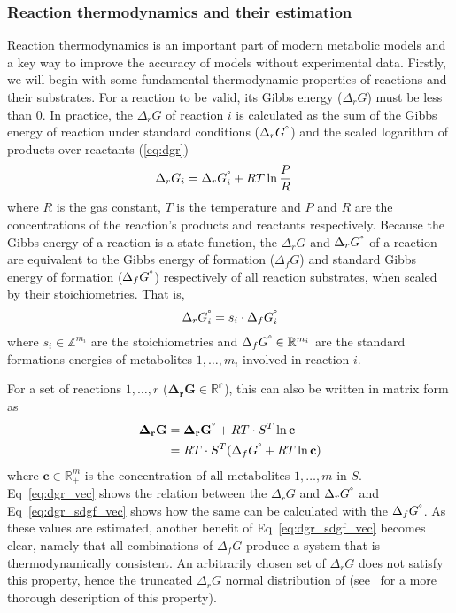 \documentclass[10pt,letterpaper]{article}
\newcommand{\dgf}{\Delta_fG}
\newcommand{\sdgf}{\Delta_fG^{\degree}}
\newcommand{\dgr}{\Delta_rG}
\newcommand{\sdgr}{\Delta_rG^{\degree}}
\newcommand{\bdgr}{\mathbf{\dgr}}
\newcommand{\bsdgr}{\mathbf{\sdgr}}
\begin{document}
\subsubsection{Reaction thermodynamics and their estimation}
Reaction thermodynamics is an important part of modern metabolic models and a key way to improve the accuracy of models without experimental data.
Firstly, we will begin with some fundamental thermodynamic properties of reactions and their substrates.
For a reaction to be valid, its Gibbs energy ($\dgr$) must be less than 0.
In practice, the $\dgr$ of reaction $i$ is calculated as the sum of the Gibbs energy of reaction under standard conditions ($\sdgr$) and the scaled logarithm of products over reactants (\ref{eq:dgr})
\begin{align}
    \dgr_i &= \sdgr_i + RT\ln \frac{P}{R} \label{eq:dgr}
\end{align}
where $R$ is the gas constant, $T$ is the temperature and $P$ and $R$ are the concentrations of the reaction's products and reactants respectively.
Because the Gibbs energy of a reaction is a state function, the $\dgr$ and $\sdgr$ of a reaction are equivalent to the Gibbs energy of formation ($\dgf$) and standard Gibbs energy of formation ($\sdgf$) respectively of all reaction substrates, when scaled by their stoichiometries.
That is,
\[
    \sdgr_i = s_i \cdot \sdgf_i
\]
where $s_i \in \mathbb{Z}^{m_i}$ are the stoichiometries and $\sdgf \in \mathbb{R}^{m_i}$ are the standard formations energies of metabolites $1,\dots,m_i$ involved in reaction $i$.

For a set of reactions $1,\dots,r$ ($\bdgr \in \mathbb{R^r}$), this can also be written in matrix form as
\begin{align}
        \bdgr &= \bsdgr + RT \cdot S^{T}\ln{\mathbf{c}} \label{eq:dgr_vec}\\
              &= RT \cdot S^T (\sdgf + RT \ln{\mathbf{c}}) \label{eq:dgr_sdgf_vec}
\end{align}
where $\mathbf{c} \in \mathbb{R}_{+}^m$ is the concentration of all metabolites $1,\dots,m$ in $S$.
Eq~\ref{eq:dgr_vec} shows the relation between the $\dgr$ and $\sdgr$ and Eq~\ref{eq:dgr_sdgf_vec} shows how the same can be calculated with the $\sdgf$.
As these values are estimated, another benefit of Eq~\ref{eq:dgr_sdgf_vec} becomes clear, namely that all combinations of $\dgf$ produce a system that is thermodynamically consistent.
An arbitrarily chosen set of $\dgr$ does not satisfy this property, hence the truncated $\dgr$ normal distribution of \cite{PTA} (see~\cite{noor_2013_equilibrator} for a more thorough description of this property).
\end{document}
